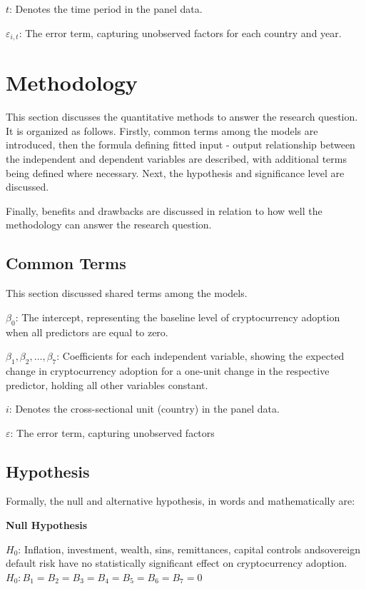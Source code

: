 \documentclass[
]{article}
\begin{document}
\(t\): Denotes the time period in the panel data.

\(\varepsilon_{i,t}\): The error term, capturing unobserved factors for each country and year.

\newpage

\section{Methodology}\label{methodology}

This section discusses the quantitative methods to answer the research question. It is organized as follows. Firstly, common terms among the models are introduced, then the formula defining fitted input - output relationship between the independent and dependent variables are described, with additional terms being defined where necessary. Next, the hypothesis and significance level are discussed.

Finally, benefits and drawbacks are discussed in relation to how well the methodology can answer the research question.

\subsection{Common Terms}\label{common-terms}

This section discussed shared terms among the models.

\(\beta_0\): The intercept, representing the baseline level of cryptocurrency adoption when all predictors are equal to zero.

\(\beta_1, \beta_2, \dots, \beta_7\): Coefficients for each independent variable, showing the expected change in cryptocurrency adoption for a one-unit change in the respective predictor, holding all other variables constant.

\(i\): Denotes the cross-sectional unit (country) in the panel data.

\(\varepsilon\): The error term, capturing unobserved factors

\subsection{Hypothesis}\label{hypothesis}

Formally, the null and alternative hypothesis, in words and mathematically are:

\textbf{Null Hypothesis}

\(H_0\): Inflation, investment, wealth, sins, remittances, capital controls and\newline sovereign default risk have no statistically significant effect on cryptocurrency adoption.\newline \newline\(H_0:B_1=B_2=B_3=B_4=B_5=B_6=B_7=0\)
\end{document}

